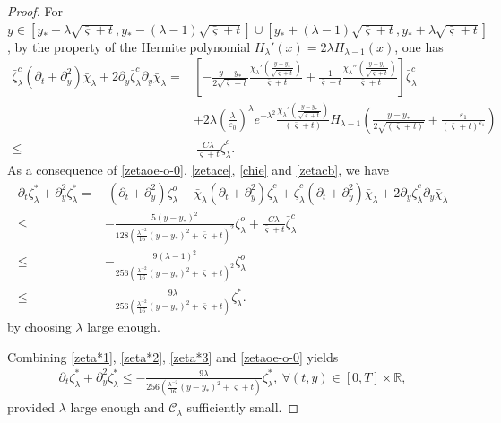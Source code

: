 \documentclass{amsart}
\numberwithin{equation}{section}
\begin{document}
\begin{proof}
For $y\in[y_{*}-\lambda\sqrt{\bar{\varsigma}+t},y_{*}-(\lambda-1)\sqrt{\bar{\varsigma}+t}]\cup[y_{*}+(\lambda-1)\sqrt{\bar{\varsigma}+t},y_{*}+\lambda\sqrt{\bar{\varsigma}+t}]$,
by the property of the Hermite polynomial $H_{\lambda}'(x)=2\lambda H_{\lambda-1}(x)$, one has
\begin{align}\label{chie}
\bar{\zeta}_{\lambda}^{c}\left(\partial_{t}+\partial_{y}^{2}\right)\bar{\chi}_{\lambda}+2\partial_{y}\bar{\zeta}_{\lambda}^{c}\partial_{y}\bar{\chi}_{\lambda}
=&\left[-\frac{y-y_{*}}{2\sqrt{\bar{\varsigma}+t}}\frac{\chi_{\lambda}'\left(\frac{y-y_{*}}{\sqrt{\bar{\varsigma}+t}}\right)}{\bar{\varsigma}+t}
  +\frac{1}{\bar{\varsigma}+t}\frac{\chi_{\lambda}''\left(\frac{y-y_{*}}{\sqrt{\bar{\varsigma}+t}}\right)}{\bar{\varsigma}+t}\right]\bar{\zeta}_{\lambda}^{c}\\
 &+2\lambda\left(\frac{\lambda}{\varepsilon_{0}}\right)^{\lambda}e^{-\lambda^{2}}\frac{\chi_{\lambda}'\left(\frac{y-y_{*}}{\sqrt{\bar{\varsigma}+t}}\right)}{(\bar{\varsigma}+t)} H_{\lambda-1}\left(\frac{y-y_{*}}{2\sqrt{(\bar{\varsigma}+t)}}+\frac{\varepsilon_{1}}{(\bar{\varsigma}+t)^{\varepsilon_{1}}}\right)\nonumber\\
\leq&~\frac{C\lambda}{\bar{\varsigma}+t}\bar{\zeta}_{\lambda}^{c}.\nonumber
\end{align}
As a consequence of \eqref{zetaoe-o-0}, \eqref{zetace}, \eqref{chie} and \eqref{zetacb}, we have
\begin{align}\label{zeta*3}
\partial_{t}\zeta_{\lambda}^{*}+\partial_{y}^{2}\zeta_{\lambda}^{*}
=&~\left(\partial_{t}+\partial_{y}^{2}\right)\zeta_{\lambda}^{o}
  +\bar{\chi}_{\lambda}\left(\partial_{t}+\partial_{y}^{2}\right)\bar{\zeta}_{\lambda}^{c}
  +\bar{\zeta}_{\lambda}^{c}\left(\partial_{t}+\partial_{y}^{2}\right)\bar{\chi}_{\lambda}
  +2\partial_{y}\bar{\zeta}_{\lambda}^{c}\partial_{y}\bar{\chi}_{\lambda}\\
\leq&-\frac{5(y-y_{*})^{2}}{128(\frac{\lambda^{-2}}{16}(y-y_{*})^{2}+\bar{\varsigma}+t)^{2}}\zeta_{\lambda}^{o}
     +\frac{C\lambda}{\bar{\varsigma}+t}\bar{\zeta}_{\lambda}^{c}\nonumber\\
\leq&-\frac{9(\lambda-1)^{2}}{256(\frac{\lambda^{-2}}{16}(y-y_{*})^{2}+\bar{\varsigma}+t)^{2}}\zeta_{\lambda}^{o}\nonumber\\
\leq&-\frac{9\lambda}{256(\frac{\lambda^{-2}}{16}(y-y_{*})^{2}+\bar{\varsigma}+t)}\zeta_{\lambda}^{*}.\nonumber
\end{align}
by choosing $\lambda$ large enough.

Combining \eqref{zeta*1}, \eqref{zeta*2}, \eqref{zeta*3} and \eqref{zetaoe-o-0} yields
\begin{align}\label{zeta*ty}
\partial_{t}\zeta_{\lambda}^{*}+\partial_{y}^{2}\zeta_{\lambda}^{*}
\leq -\frac{9\lambda}{256(\frac{\lambda^{-2}}{16}(y-y_{*})^{2}+\bar{\varsigma}+t)}\zeta_{\lambda}^{*},~
\forall (t,y)\in [0,T]\times\mathbb{R},
\end{align}
provided $\lambda$ large enough and $\mathcal{C}_{\lambda}$  sufficiently small.


\end{proof}
\end{document}

